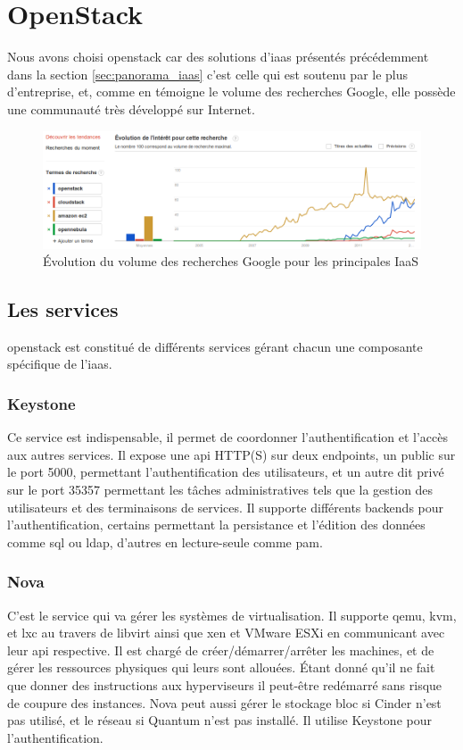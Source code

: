\documentclass[a4paper,oneside]{report}
\begin{document}
\section{OpenStack}
Nous avons choisi \gls{openstack} car des solutions d'\gls{iaas} présentés précédemment dans la section \ref{sec:panorama_iaas} c'est celle qui est soutenu par le plus d'entreprise, et, comme en témoigne le volume des recherches Google, elle possède une communauté très développé sur Internet.
\begin{figure}[h!]
\centering
\includegraphics[resolution=140]{images/recherches_iaas.png}
\caption{Évolution du volume des recherches Google pour les principales IaaS}
\end{figure}


\subsection{Les services}
\gls{openstack} est constitué de différents services gérant chacun une composante spécifique de l'\gls{iaas}.
\subsubsection{Keystone}
Ce service est indispensable, il permet de coordonner l'authentification et l'accès aux autres services.\newline
Il expose une \gls{api} HTTP(S) sur deux endpoints, un public sur le port 5000, permettant l'authentification des utilisateurs, et un autre dit privé sur le port 35357 permettant les tâches administratives tels que la gestion des utilisateurs et des terminaisons de services.
Il supporte différents backends pour l'authentification, certains permettant la persistance et l'édition des données comme \gls{sql} ou \gls{ldap}, d'autres en lecture-seule comme \gls{pam}.\newline

\subsubsection{Nova}
C'est le service qui va gérer les systèmes de \gls{virtualisation}. Il supporte \gls{qemu}, \gls{kvm}, et \gls{lxc} au travers de libvirt ainsi que \gls{xen} et VMware ESXi en communicant avec leur \gls{api} respective.
Il est chargé de créer/démarrer/arrêter les machines, et de gérer les ressources physiques qui leurs sont allouées. Étant donné qu'il ne fait que donner des instructions aux hyperviseurs il peut-être redémarré sans risque de coupure des instances.\newline
Nova peut aussi gérer le stockage bloc si Cinder n'est pas utilisé, et le réseau si Quantum n'est pas installé.\newline
Il utilise Keystone pour l'authentification.
\end{document}
